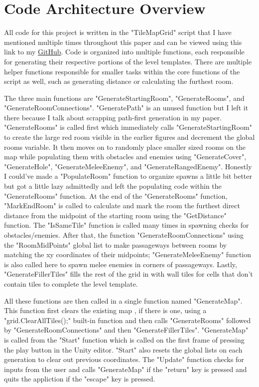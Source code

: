 \documentclass[10pt,twocolumn]{article}
\begin{document}
\section{Code Architecture Overview}

All code for this project is written in the "TileMapGrid" script that I have mentioned multiple times throughout this paper and can be viewed using this link to my \href{https://github.com/Lukas-Howlett/SeniorComps/blob/main/TileMapGrid.cs}{GitHub}. Code is organized into multiple functions, each responsible for generating their respective portions of the level templates. There are multiple helper functions responsible for smaller tasks within the core functions of the script as well, such as generating distance or calculating the furthest room. 

The three main functions are "GenerateStartingRoom", "GenerateRooms", and "GenerateRoomConnections". "GeneratePath" is an unused function but I left it there because I talk about scrapping path-first generation in my paper. "GenerateRooms" is called first which immediately calls "GenerateStartingRoom" to create the large red room visible in the earlier figures and decrement the global rooms variable. It then moves on to randomly place smaller sized rooms on the map while populating them with obstacles and enemies using "GenerateCover", "GenerateHole", "GenerateMeleeEnemy", and "GenerateRangedEnemy". Honestly I could've made a "PopulateRoom" function to organize spawns a little bit better but got a little lazy admittedly and left the populating code within the "GenerateRooms" function. At the end of the "GenerateRooms" function, "MarkEndRoom" is called to calculate and mark the room the furthest direct distance from the midpoint of the starting room using the "GetDistance" function. The "IsSameTile" function is called many times in spawning checks for obstacles/enemies. After that, the function "GenerateRoomConnections" using the "RoomMidPoints" global list to make passageways between rooms by matching the xy coordinates of their midpoints; "GenerateMeleeEnemy" function is also called here to spawn melee enemies in corners of passageways. Lastly, "GenerateFillerTiles" fills the rest of the grid in with wall tiles for cells that don't contain tiles to complete the level template.

All these functions are then called in a single function named "GenerateMap". This function first clears the existing map , if there is one, using a "grid.ClearAllTiles();" built-in function and then calls "GenerateRooms" followed by "GenerateRoomConnections" and then "GenerateFillerTiles". "GenerateMap" is called from the "Start" function which is called on the first frame of pressing the play button in the Unity editor. "Start" also resets the global lists on each generation to clear out previous coordinates. The "Update" function checks for inputs from the user and calls "GenerateMap" if the "return" key is pressed and quits the appliction if the "escape" key is pressed. 

\printbibliography
\end{document}
